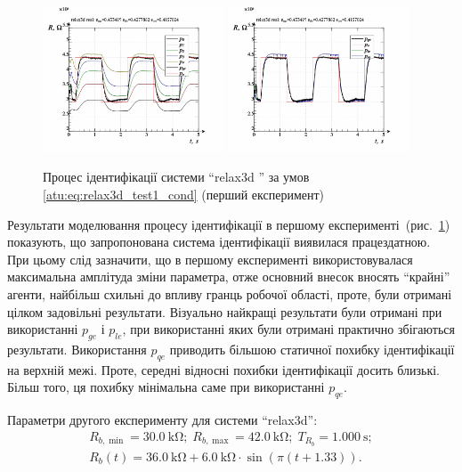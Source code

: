 \begin{figure}[htb!]
  \centerline{
    \includegraphics[width=0.48\textwidth]{p/relax3d_read_id2-p_p_00.png}
    \hfill
    \includegraphics[width=0.48\textwidth]{p/relax3d_read_id2-p_pp_00.png}
  }
  \caption{Процес ідентифікації системи ``relax3d '' за умов \ref{atu:eq:relax3d_test1_cond} (перший експеримент)}
  \label{atu:f:relax3d_id_1}
\end{figure}

Результати моделювання процесу ідентифікації в першому
експерименті~(рис.~\ref{atu:f:relax3d_id_1}) показують, що запропонована
система ідентифікації виявилася працездатною. При цьому
слід зазначити, що в першому експерименті використовувалася
максимальна амплітуда зміни параметра, отже основний внесок
вносять ``крайні'' агенти, найбільш схильні до впливу гранць
робочої області, проте, були отримані цілком задовільні
результати. Візуально найкращі результати були отримані при
використанні
$p_{ge} $ і
$p_{le} $, при використанні яких були отримані практично збігаються
результати. Використання
$p_{qe} $ приводить більшою статичної похибку ідентифікації на
верхній межі. Проте, середні відносні похибки ідентифікації
досить близькі. Більш того, ця похибку мінімальна саме при
використанні $ p_{qe} $.



Параметри другого експерименту для системи ``relax3d'':
%
\begin{equation}
  \begin{array}{c}
    R_{b,\min} = \SI{30.0}{\kilo\ohm};
    \;
    R_{b,\max} = \SI{42.0}{\kilo\ohm};
    \;
    T_{R_b} = \SI{1.000}{\second};
  \\
    R_b(t) = \SI{36.0}{\kilo\ohm} + \SI{6.0}{\kilo\ohm} \cdot \sin( \pi ( t + 1.33 ) ).
  \end{array}
  \label{atu:eq:relax3d_test2_cond}
\end{equation}

